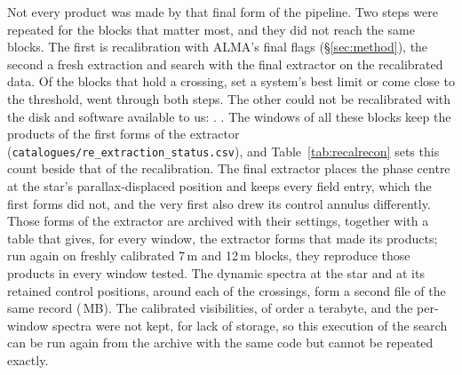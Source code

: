 Not every product was made by that final form of the pipeline. Two steps
were repeated for the blocks that matter most, and they did not reach the
same blocks. The first is recalibration with ALMA's final flags
(\S\ref{sec:method}), the second a fresh extraction and search with the
final extractor on the recalibrated data. Of
the \XgNBlkPlan{} blocks that hold a crossing, set a system's best limit or
come close to the threshold, \XgNBlkReDone{} went through both steps. The
other \XgNBlkNotRe{} could not be recalibrated with the disk and software
available to us: \XgNotReClause. \LrNotReClause. The windows of all these blocks keep
the products of the first forms of the extractor
(\texttt{catalogues/\allowbreak re\_extraction\_status.csv}), and
Table~\ref{tab:recalrecon} sets this count beside that of the
recalibration. The final extractor places the phase
centre at the star's parallax-displaced position and keeps every field entry,
which the first forms did not, and the very first also drew its control
annulus differently. Those forms of the extractor are archived with their settings,
together with a table that gives, for every window, the extractor forms that made
its products; run again on freshly calibrated 7\,m and 12\,m blocks, they
reproduce those products in every window tested. The dynamic spectra at the
star and at its \RcNRetCtrl{} retained control positions, around each of the
\DaNSpecCross{} crossings, form a second file of the same record
(\DaSpecFileMB\,MB). The calibrated visibilities, of order a terabyte, and the
per-window spectra were not kept, for lack of storage, so this execution of
the search can be run again from the archive with the same code but cannot be
repeated exactly.
